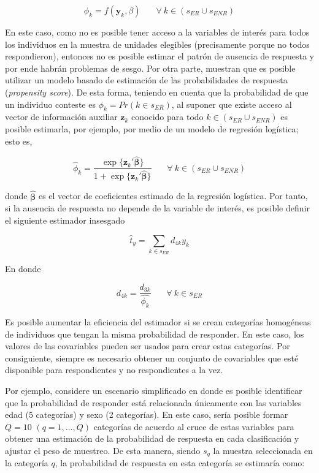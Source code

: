 \documentclass[
  12pt,
  spanish,
]{book}
\begin{document}
\[
\phi_k = f(\mathbf{y}_k, \beta)   \ \ \ \ \ \ \ \ \forall \ k \in (s_{ER} \cup s_{ENR})
\]

En este caso, como no es posible tener acceso a la variables de interés para todos los individuos en la muestra de unidades elegibles (precisamente porque no todos respondieron), entonces no es posible estimar el patrón de ausencia de respuesta y por ende habrán problemas de sesgo. Por otra parte, \citet{Kim_Riddles_2012} muestran que es posible utilizar un modelo basado de estimación de las probabilidades de respuesta (\emph{propensity score}). De esta forma, teniendo en cuenta que la probabilidad de que un individuo conteste es \(\phi_k = Pr(k \in s_{ER})\), al suponer que existe acceso al vector de información auxiliar \(\mathbf{z}_k\) conocido para todo \(k\in (s_{ER} \cup s_{ENR})\) es posible estimarla, por ejemplo, por medio de un modelo de regresión logística; esto es,

\[
\hat{\phi}_k = \frac{\exp\{\mathbf{z}_k'\hat{\boldsymbol{\beta}}\}}{1 + \exp\{\mathbf{z}_k'\hat{\boldsymbol{\beta}}\}}   \ \ \ \ \ \ \ \ \forall \ k \in (s_{ER} \cup s_{ENR})
\]

donde \(\hat{\mathbf{\beta}}\) es el vector de coeficientes estimado de la regresión logística. Por tanto, si la ausencia de respuesta no depende de la variable de interés, es posible definir el siguiente estimador insesgado

\[
\hat{t}_y=\sum_{k\in s_{ER}}d_{4k}y_k
\]

En donde

\[
d_{4k} = \frac{d_{3k}}{\hat{\phi_k}}  \ \ \ \ \ \ \ \ \forall \ k  \in s_{ER}
\]

Es posible aumentar la eficiencia del estimador si se crean categorías homogéneas de individuos que tengan la misma probabilidad de responder. En este caso, los valores de las covariables pueden ser usados para crear estas categorías. Por consiguiente, siempre es necesario obtener un conjunto de covariables que esté disponible para respondientes y no respondientes a la vez.

Por ejemplo, considere un escenario simplificado en donde es posible identificar que la probabilidad de responder está relacionada únicamente con las variables edad (5 categorías) y sexo (2 categorías). En este caso, sería posible formar \(Q=10\) \((q = 1, \ldots, Q)\) categorías de acuerdo al cruce de estas variables para obtener una estimación de la probabilidad de respuesta en cada clasificación y ajustar el peso de muestreo. De esta manera, siendo \(s_{q}\) la muestra seleccionada en la categoría \(q\), la probabilidad de respuesta en esta categoría se estimaría como:
\end{document}
